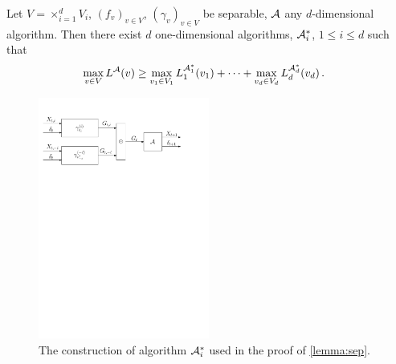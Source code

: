 \begin{lemma}
\label{lemma:sep}
Let $V= \times_{i=1}^d V_i$, $(f_v)_{v\in V}$, $(\gamma_v)_{v\in V}$ be separable, $\mathcal{A}$ any $d$-dimensional algorithm. Then there exist  $d$ one-dimensional algorithms, $\mathcal{A}_i^*$, $1\le i \le d$
such that 
\begin{align}
\label{eq:onedimlb}
&\max_{v\in V} L^{\mathcal{A}}(v) 
\ge   \max_{v_1\in V_1} L_1^{\mathcal{A}_1^*}(v_1) + \dots + \max_{v_d\in V_d} L_d^{\mathcal{A}^*_d}(v_d)\,.
\end{align}
\end{lemma}
\begin{figure}
\begin{center}
	\includegraphics[width=0.5\textwidth]{../figs/ddimto1dim_reduction} %
\end{center}
\caption{The construction of algorithm $\mathcal{A}_i^*$ used in the proof of \cref{lemma:sep}.}
\label{fig:sepalgconstruction}
\end{figure}
